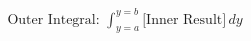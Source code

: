 \documentclass[preview]{standalone}
\begin{document}
\begin{align*}
\text{Outer Integral: } \int_{y=a}^{y=b} \big[\text{Inner Result}\big]\,dy
\end{align*}
\end{document}
